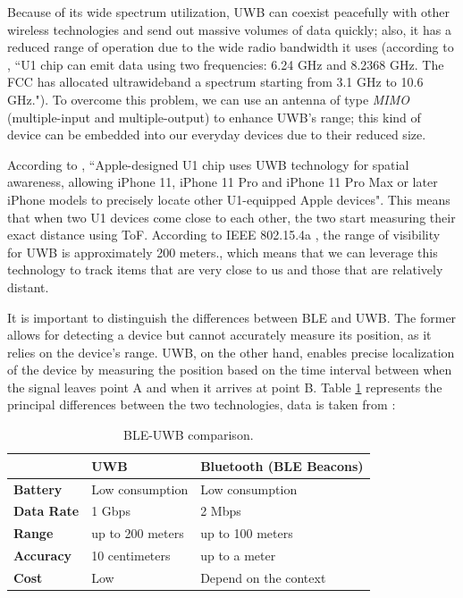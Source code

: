 \documentclass[english]{article}
\begin{document}
Because of its wide spectrum utilization, UWB can coexist peacefully with other wireless technologies and send out massive volumes of data quickly; also, it has a reduced range of operation due to the wide radio bandwidth it uses (according to \cite{Zafar2019}, ``U1 chip can emit data using two frequencies: 6.24 GHz and 8.2368 GHz. The FCC has allocated ultrawideband a spectrum starting from 3.1 GHz to 10.6 GHz."). To overcome this problem, we can use an antenna of type \textit{MIMO} (multiple-input and multiple-output) to enhance UWB's range; this kind of device can be embedded into our everyday devices due to their reduced size.

According to \cite{aps}, ``Apple-designed U1 chip uses UWB technology for spatial awareness, allowing iPhone 11, iPhone 11 Pro and iPhone 11 Pro Max or later iPhone models to precisely locate other U1-equipped Apple devices". This means that when two U1 devices come close to each other, the two start measuring their exact distance using ToF. According to IEEE 802.15.4a \cite{5394030}, the range of visibility for UWB is approximately 200 meters., which means that we can leverage this technology to track items that are very close to us and those that are relatively distant.

It is important to distinguish the differences between BLE and UWB. The former allows for detecting a device but cannot accurately measure its position, as it relies on the device's range. UWB, on the other hand, enables precise localization of the device by measuring the position based on the time interval between when the signal leaves point A and when it arrives at point B.
Table \ref{tableu} represents the principal differences between the two technologies, data is taken from \cite{encstore}:
\begin{table}[h] 
\caption{BLE-UWB comparison.}
  \centering
  
    \begin{tabular}{l|l|l|}
      \cline{2-3}
      {}                               & {\textbf{UWB}}                & { \textbf{Bluetooth (BLE Beacons)}} \\ \hline
      \multicolumn{1}{|l|}{{  \textbf{Battery}}}  & {  Low consumption}             & {  Low consumption}                  \\ \hline
      \multicolumn{1}{|l|}{{  \textbf{Data Rate}}}  & { 1 Gbps }             & { 2 Mbps }                  \\ \hline
      \multicolumn{1}{|l|}{{  \textbf{Range}}}    & {  up to 200 meters} & {  up to 100 meters}       \\ \hline
      \multicolumn{1}{|l|}{{  \textbf{Accuracy}}} & {  10 centimeters} & {  up to a meter}                    \\ \hline
      \multicolumn{1}{|l|}{{  \textbf{Cost}}}     & {  Low}                         & {Depend on the context }                              \\ \hline
    \end{tabular}
    \label{tableu}
  \end{table}
\end{document}
